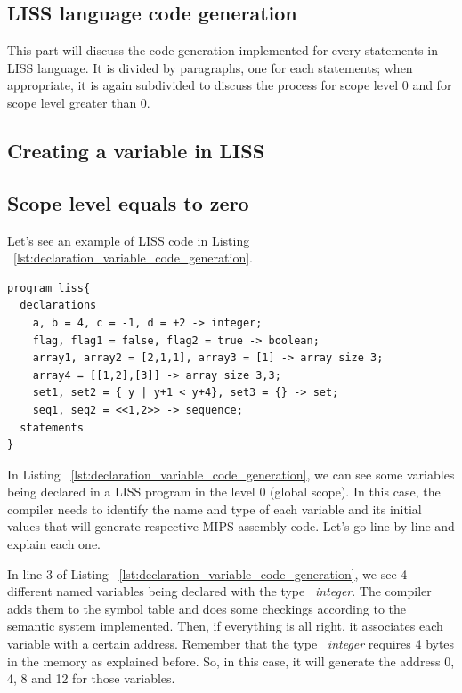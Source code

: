 \documentclass[
  oneside,
  11pt, a4paper,
  footinclude=true,
  headinclude=true,
  cleardoublepage=empty
]{scrbook}
\begin{document}
\subsection{LISS language code generation}

This part will discuss the code generation implemented for every statements in LISS language.
It is divided by paragraphs, one for each statements; when appropriate, it is again subdivided to discuss the process for scope level 0 and for scope level greater than 0.

\subsection{Creating a variable in LISS}

\subsection*{Scope level equals to zero}


Let's see an example of LISS code in Listing ~\ref{lst:declaration_variable_code_generation}.

\begin{lstlisting}[caption={Declaration block in LISS, to illustrate the creation of variables},label={lst:declaration_variable_code_generation}]
program liss{
  declarations
    a, b = 4, c = -1, d = +2 -> integer;
    flag, flag1 = false, flag2 = true -> boolean;
    array1, array2 = [2,1,1], array3 = [1] -> array size 3;
    array4 = [[1,2],[3]] -> array size 3,3;
    set1, set2 = { y | y+1 < y+4}, set3 = {} -> set;
    seq1, seq2 = <<1,2>> -> sequence;
  statements
}
\end{lstlisting}

In Listing ~\ref{lst:declaration_variable_code_generation}, we can see some variables being declared in a LISS program in the level 0 (global scope).
In this case, the compiler needs to identify the name and type of each variable and its initial values that will generate respective MIPS assembly code.
Let's go line by line and explain each one.

In line 3 of Listing ~\ref{lst:declaration_variable_code_generation}, we see 4 different named variables being declared with the type ~\textit{integer}.
The compiler adds them to the symbol table and does some checkings according to the semantic system implemented. Then, if everything is all right, it associates each variable with a certain address. Remember that the type ~\textit{integer} requires 4 bytes in the memory as explained before. So, in this case, it will generate the address 0, 4, 8 and 12 for those variables.
\end{document}
